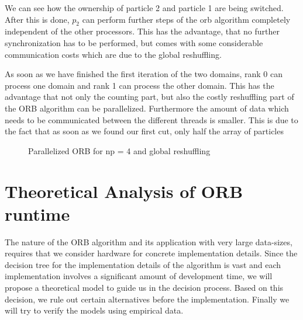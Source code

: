 \documentclass[]{article}
\begin{document}
We can see how the ownership of particle 2 and particle 1 are being switched. After this is done, $p_2$ can perform further steps of the orb algorithm completely independent of the other processors. This has the advantage, that no further synchronization has to be performed, but comes with some considerable communication costs which are due to the global reshuffling. 

As soon as we have finished the first iteration of the  two domains, rank 0 can process one domain and rank 1 can process the other domain. This has the advantage that not only the counting part, but also the costly reshuffling part of the ORB algorithm can be parallelized. Furthermore the amount of data which needs to be communicated between the different threads is smaller. This is due to the fact that as soon as we found our first cut, only half the array of particles 


\begin{figure}[H]
	\begin{center}
	\end{center}
	\caption{Parallelized ORB for np = 4 and global reshuffling}
	\label{fig:orb_parallel}
\end{figure}



\newpage
\section{Theoretical Analysis of ORB runtime}

The nature of the ORB algorithm and its application with very large data-sizes, requires that we consider hardware for concrete implementation details. Since the decision tree for the implementation details of the algorithm is vast and each implementation involves a significant amount of development time, we will propose a theoretical model to guide us in the decision process. Based on this decision, we rule out certain alternatives before the implementation. Finally we will try to verify the models using empirical data.
\end{document}
